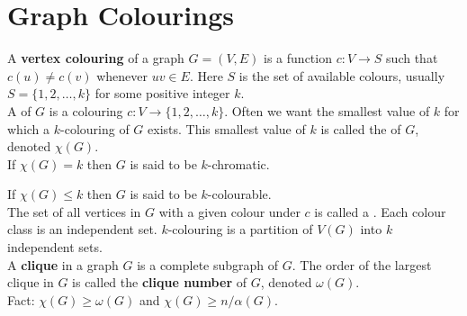 \chapter{Graph Colourings}

A \textbf{vertex colouring} of a graph \(G = (V, E)\) is a function \(c: V \to S\) such that \(c(u) \neq c(v)\) whenever \(uv \in E\). Here \(S\) is the set of available colours, usually \(S = \{1, 2, \dots, k\}\) for some positive integer \(k\). \\

A  of \(G\) is a colouring \(c: V \to \{1, 2, \dots, k\}\). Often we want the smallest value of \(k\) for which a \(k\)-colouring of \(G\) exists. This smallest value of \(k\) is called the  of \(G\), denoted \(\chi(G)\). \\

If \(\chi(G) = k\) then \(G\) is said to be \(k\)-chromatic.

If \(\chi(G) \leq k\) then \(G\) is said to be \(k\)-colourable. \\

The set of all vertices in \(G\) with a given colour under \(c\) is called a . Each colour class is an independent set. \(k\)-colouring is a partition of \(V(G)\) into \(k\) independent sets. \\

A \textbf{clique} in a graph \(G\) is a complete subgraph of \(G\). The order of the largest clique in \(G\) is called the \textbf{clique number} of \(G\), denoted \(\omega(G)\). \\

Fact: \(\chi(G) \geq \omega(G)\) and \(\chi(G) \geq n/\alpha(G)\).
